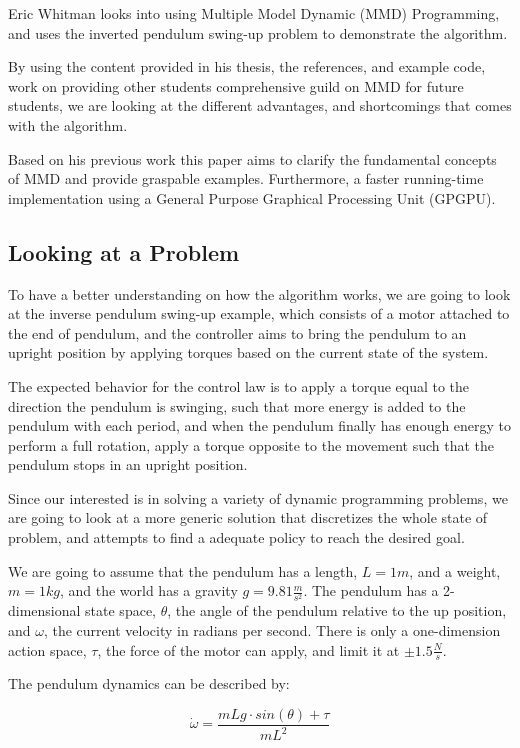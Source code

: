 \documentclass[12pt]{report}
\begin{document}
Eric Whitman looks into using Multiple Model Dynamic (MMD) Programming, and uses the inverted pendulum swing-up problem to demonstrate the algorithm. \cite{eric_thesis}
 
By using the content provided in his thesis, the references, and example code, work on providing other students comprehensive guild on MMD for future students, we are looking at the different advantages, and shortcomings that comes with the algorithm.

Based on his previous work this paper aims to clarify the fundamental concepts of MMD and provide graspable examples. Furthermore, a faster running-time implementation using a General Purpose Graphical Processing Unit (GPGPU).

\subsection{Looking at a Problem}
To have a better understanding on how the algorithm works, we are going to look at the  inverse pendulum swing-up example, which consists of a motor attached to the end of pendulum, and the controller aims to bring the pendulum to an upright position by applying torques based on the current state of the system. 

The expected behavior for the control law is to apply a torque equal to the direction the pendulum is swinging, such that more energy is added to the pendulum with each period, and when the pendulum finally has enough energy to perform a full rotation, apply a torque opposite to the movement such that the pendulum stops in an upright position.  

Since our interested is in solving a variety of dynamic programming problems, we are going to look at a more generic solution that discretizes the whole state of problem, and attempts to find a adequate policy to reach the desired goal.

We are going to assume that the pendulum has a length, $L=1m$, and a weight, $m=1kg$, and the world has a gravity $g=9.81\frac{m}{s^2}$. The pendulum has a 2-dimensional state space, $\theta$, the angle of the pendulum relative to the up position, and $\omega$, the current velocity in radians per second. There is only a one-dimension action space, $\tau$, the force of the motor can apply, and limit it at $\pm 1.5 \frac{N}{s}$.

The pendulum dynamics can be described by:

\begin{equation} 
\dot{\omega} = \frac{mLg \cdot sin(\theta) + \tau}{mL^2}
\end{equation}
\end{document}
